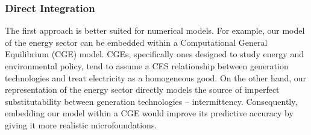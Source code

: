 \documentclass[11pt,a4paper,leqno]{extarticle}
\begin{document}
	\subsubsection{Direct Integration}
	
	The first approach is better suited for numerical models. For example, our model of the energy sector can be embedded within a Computational General Equilibrium (CGE) model. CGEs, specifically ones designed to study energy and environmental policy, tend to assume a CES relationship between generation technologies and treat electricity as a homogeneous good. On the other hand, our representation of the energy sector directly models the source of imperfect substitutability between generation technologies -- intermittency. Consequently, embedding our model within a CGE would improve its predictive accuracy by giving it more realistic microfoundations. 
	
\end{document}
